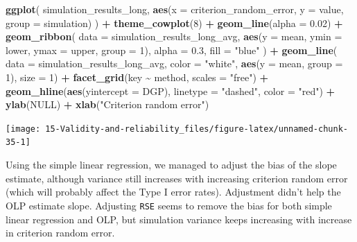 \documentclass[
]{book}
\newenvironment{Shaded}{\begin{snugshade}}{\end{snugshade}}
\newcommand{\DataTypeTok}[1]{\textcolor[rgb]{0.13,0.29,0.53}{#1}}
\newcommand{\DecValTok}[1]{\textcolor[rgb]{0.00,0.00,0.81}{#1}}
\newcommand{\FloatTok}[1]{\textcolor[rgb]{0.00,0.00,0.81}{#1}}
\newcommand{\KeywordTok}[1]{\textcolor[rgb]{0.13,0.29,0.53}{\textbf{#1}}}
\newcommand{\NormalTok}[1]{#1}
\newcommand{\OperatorTok}[1]{\textcolor[rgb]{0.81,0.36,0.00}{\textbf{#1}}}
\newcommand{\OtherTok}[1]{\textcolor[rgb]{0.56,0.35,0.01}{#1}}
\newcommand{\StringTok}[1]{\textcolor[rgb]{0.31,0.60,0.02}{#1}}
\begin{document}
\begin{Shaded}
\begin{Highlighting}[]
\KeywordTok{ggplot}\NormalTok{(}
\NormalTok{  simulation\_results\_long,}
  \KeywordTok{aes}\NormalTok{(}\DataTypeTok{x =}\NormalTok{ criterion\_random\_error, }\DataTypeTok{y =}\NormalTok{ value, }\DataTypeTok{group =}\NormalTok{ simulation)}
\NormalTok{) }\OperatorTok{+}
\StringTok{  }\KeywordTok{theme\_cowplot}\NormalTok{(}\DecValTok{8}\NormalTok{) }\OperatorTok{+}
\StringTok{  }\KeywordTok{geom\_line}\NormalTok{(}\DataTypeTok{alpha =} \FloatTok{0.02}\NormalTok{) }\OperatorTok{+}
\StringTok{  }\KeywordTok{geom\_ribbon}\NormalTok{(}
    \DataTypeTok{data =}\NormalTok{ simulation\_results\_long\_avg,}
    \KeywordTok{aes}\NormalTok{(}\DataTypeTok{y =}\NormalTok{ mean, }\DataTypeTok{ymin =}\NormalTok{ lower, }\DataTypeTok{ymax =}\NormalTok{ upper, }\DataTypeTok{group =} \DecValTok{1}\NormalTok{),}
    \DataTypeTok{alpha =} \FloatTok{0.3}\NormalTok{, }\DataTypeTok{fill =} \StringTok{"blue"}
\NormalTok{  ) }\OperatorTok{+}
\StringTok{  }\KeywordTok{geom\_line}\NormalTok{(}
    \DataTypeTok{data =}\NormalTok{ simulation\_results\_long\_avg,}
    \DataTypeTok{color =} \StringTok{"white"}\NormalTok{,}
    \KeywordTok{aes}\NormalTok{(}\DataTypeTok{y =}\NormalTok{ mean, }\DataTypeTok{group =} \DecValTok{1}\NormalTok{),}
    \DataTypeTok{size =} \DecValTok{1}\NormalTok{) }\OperatorTok{+}
\StringTok{  }\KeywordTok{facet\_grid}\NormalTok{(key }\OperatorTok{\textasciitilde{}}\StringTok{ }\NormalTok{method, }\DataTypeTok{scales =} \StringTok{"free"}\NormalTok{) }\OperatorTok{+}
\StringTok{  }\KeywordTok{geom\_hline}\NormalTok{(}\KeywordTok{aes}\NormalTok{(}\DataTypeTok{yintercept =}\NormalTok{ DGP), }\DataTypeTok{linetype =} \StringTok{"dashed"}\NormalTok{, }\DataTypeTok{color =} \StringTok{"red"}\NormalTok{) }\OperatorTok{+}
\StringTok{  }\KeywordTok{ylab}\NormalTok{(}\OtherTok{NULL}\NormalTok{) }\OperatorTok{+}
\StringTok{  }\KeywordTok{xlab}\NormalTok{(}\StringTok{"Criterion random error"}\NormalTok{)}
\end{Highlighting}
\end{Shaded}

\begin{center}\texttt{[image: 15-Validity-and-reliability\_files/figure-latex/unnamed-chunk-35-1]} \end{center}

Using the simple linear regression, we managed to adjust the bias of the slope estimate, although variance still increases with increasing criterion random error (which will probably affect the Type I error rates). Adjustment didn't help the OLP estimate slope. Adjusting \texttt{RSE} seems to remove the bias for both simple linear regression and OLP, but simulation variance keeps increasing with increase in criterion random error.
\end{document}
